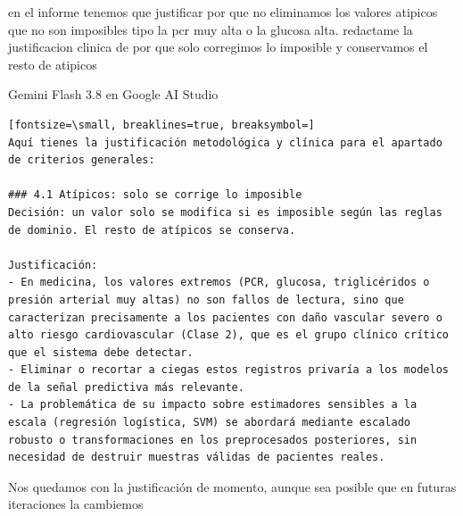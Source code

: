 \documentclass[12pt,a4paper,oneside]{book}
\begin{document}
\begin{iaprompt}
en el informe tenemos que justificar por que no eliminamos los valores atipicos que no son imposibles tipo la pcr muy alta o la glucosa alta. redactame la justificacion clinica de por que solo corregimos lo imposible y conservamos el resto de atipicos
\end{iaprompt}
\begin{iaresp}{Gemini Flash 3.8 en Google AI Studio}
\begin{Verbatim}[fontsize=\small, breaklines=true, breaksymbol=]
Aquí tienes la justificación metodológica y clínica para el apartado de criterios generales:

### 4.1 Atípicos: solo se corrige lo imposible
Decisión: un valor solo se modifica si es imposible según las reglas de dominio. El resto de atípicos se conserva.

Justificación:
- En medicina, los valores extremos (PCR, glucosa, triglicéridos o presión arterial muy altas) no son fallos de lectura, sino que caracterizan precisamente a los pacientes con daño vascular severo o alto riesgo cardiovascular (Clase 2), que es el grupo clínico crítico que el sistema debe detectar.
- Eliminar o recortar a ciegas estos registros privaría a los modelos de la señal predictiva más relevante.
- La problemática de su impacto sobre estimadores sensibles a la escala (regresión logística, SVM) se abordará mediante escalado robusto o transformaciones en los preprocesados posteriores, sin necesidad de destruir muestras válidas de pacientes reales.
\end{Verbatim}
\end{iaresp}
\begin{iaanalisis}
Nos quedamos con la justificación de momento, aunque sea posible que en futuras iteraciones la cambiemos
\end{iaanalisis}
\end{document}
